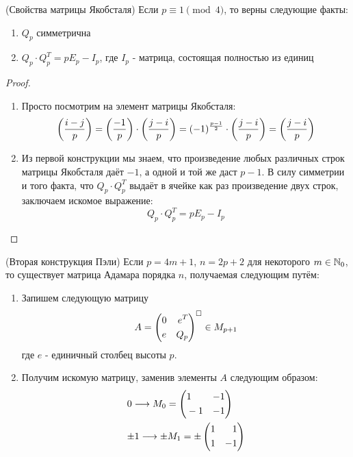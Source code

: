 \begin{lemma} (Свойства матрицы Якобсталя)
	Если $p \equiv 1 \pmod 4$, то верны следующие факты:
	\begin{enumerate}
		\item $Q_p$ симметрична
		
		\item \(Q_p \cdot Q^T_p = pE_p - I_p\), где $I_p$ - матрица, состоящая полностью из единиц
	\end{enumerate}
\end{lemma}

\begin{proof}~
	\begin{enumerate}
		\item Просто посмотрим на элемент матрицы Якобсталя:
		\[
			\left(\frac{ i - j }{ p }\right) = \left(\frac{ -1 }{ p }\right) \cdot \left(\frac{ j - i }{ p }\right) = (-1)^{\frac{p - 1}{2}} \cdot \left(\frac{ j - i }{ p }\right) = \left(\frac{ j - i }{ p }\right)
		\]
		
		\item Из первой конструкции мы знаем, что произведение любых различных строк матрицы Якобсталя даёт $-1$, а одной и той же даст  $p - 1$. В силу симметрии и того факта, что $Q_p \cdot Q^T_p$ выдаёт в ячейке как раз произведение двух строк, заключаем искомое выражение:
		\[
			Q_p \cdot Q^T_p = pE_p - I_p
		\]
	\end{enumerate}
\end{proof}

\begin{proposition} (Вторая конструкция Пэли)
	Если $p = 4m + 1$, $n = 2p + 2$ для некоторого $m \in \mathbb{N}_0$, то существует матрица Адамара порядка $n$, получаемая следующим путём:
	\begin{enumerate}
		\item Запишем следующую матрицу
		\[
			A = \left(\begin{aligned}&0 &e^T \\ &e &Q_p\end{aligned}\right)^\square \in M_{p + 1}
		\]
		где $e$ - единичный столбец высоты $p$.
		
		\item Получим искомую матрицу, заменив элементы $A$ следующим образом:
		\begin{align*}
			&{0 \longrightarrow M_0 = \left(\begin{aligned}&1 &{-1} \\ &-1 &{-1}\end{aligned}\right)}
			\\
			&{\pm 1 \longrightarrow \pm M_1 = \pm \left(\begin{aligned}&1 &1 \\ &1 &{-1}\end{aligned}\right)}
		\end{align*}
	\end{enumerate}
\end{proposition}


